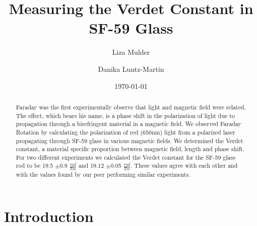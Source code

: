 \documentclass[prb,preprint]{revtex4-1}
\begin{document}

\title{Measuring the Verdet Constant in SF-59 Glass}


\author{Liza Mulder}


\author{Danika Luntz-Martin}


\date{\today}



\begin{abstract}

Faraday was the first experimentally observe that light and magnetic field were related. The effect, which bears his name, is a phase shift in the polarization of light due to propagation through a birefringent material in a magnetic field. We observed Faraday Rotation by calculating the polarization of red (650nm) light from a polarized laser propagating through SF-59 glass in various magnetic fields. We determined the Verdet constant, a material specific proportion between magnetic field, length and phase shift. For two different experiments we calculated the Verdet constant for the SF-59 glass rod to be 19.5 $\pm$0.9 $\frac{rad}{Tm}$ and 19.12 $\pm$0.05 $\frac{rad}{Tm}$. These values agree with each other and with the values found by our peer performing similar experiments.

\end{abstract}

\maketitle %


\section{Introduction} %
\end{document}
